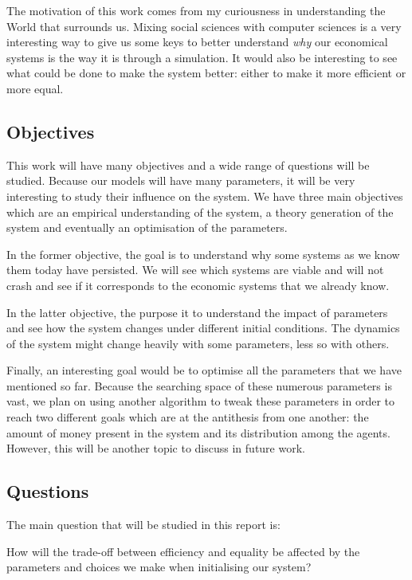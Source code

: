 \documentclass[12pt]{article}
\begin{document}
The motivation of this work comes from my curiousness in understanding the World that surrounds us. Mixing social sciences with computer sciences is a very interesting way to give us some keys to better understand \emph{why} our economical systems is the way it is through a simulation. It would also be interesting to see what could be done to make the system better: either to make it more efficient or more equal.

\subsection{Objectives}

This work will have many objectives and a wide range of questions will be studied. Because our models will have many parameters, it will be very interesting to study their influence on the system. We have three main objectives which are an empirical understanding of the system, a theory generation of the system \cite{tesfatsion_handbook} and eventually an optimisation of the parameters.

In the former objective, the goal is to understand why some systems as we know them today have persisted. We will see which systems are viable and will not crash and see if it corresponds to the economic systems that we already know.

In the latter objective, the purpose it to understand the impact of parameters and see how the system changes under different initial conditions. The dynamics of the system might change heavily with some parameters, less so with others.

Finally, an interesting goal would be to optimise all the parameters that we have mentioned so far. Because the searching space of these numerous parameters is vast, we plan on using another algorithm to tweak these parameters in order to reach two different goals which are at the antithesis from one another: the amount of money present in the system and its distribution among the agents. However, this will be another topic to discuss in future work.

\subsection{Questions}

The main question that will be studied in this report is:

\vspace*{0.5cm}

\begin{center}
    How will the trade-off between efficiency and equality be affected by the parameters and choices we make when initialising our system?
\end{center}
\end{document}
